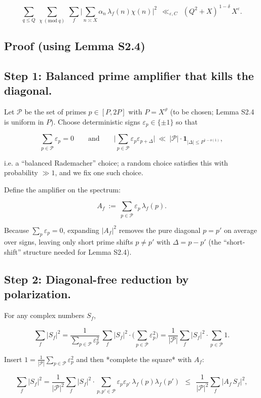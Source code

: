 \documentclass[11pt]{article}
\theoremstyle{definition}
\theoremstyle{remark}
\begin{document}
$$
\sum_{q\le Q}\ \sum_{\chi\ (\mathrm{mod}\ q)}\ \sum_{f}
\Bigg|\sum_{n\asymp X}\alpha_n\,\lambda_f(n)\chi(n)\Bigg|^2
\ \ \ll_{\varepsilon,C}\ \ (Q^2+X)^{\,1-\delta}\,X^{\varepsilon}.
$$

\subsection*{Proof (using Lemma S2.4)}

\subsection*{Step 1: Balanced prime amplifier that kills the diagonal.}
Let $\mathcal P$ be the set of primes $p\in[P,2P]$ with $P=X^\vartheta$ (to be chosen; Lemma S2.4 is uniform in $P$).
Choose deterministic signs $\varepsilon_p\in\{\pm 1\}$ so that

$$
\sum_{p\in\mathcal P}\varepsilon_p=0
\qquad\text{and}\qquad
\Big|\sum_{p\in\mathcal P}\varepsilon_p\varepsilon_{p+\Delta}\Big|\ \ll\ |\mathcal P|\cdot \mathbf{1}_{|\Delta|\le P^{1-o(1)}},
$$

i.e. a “balanced Rademacher” choice; a random choice satisfies this with probability $\gg 1$, and we fix one such choice.

Define the amplifier on the spectrum:

$$
A_f \ :=\ \sum_{p\in\mathcal P}\varepsilon_p\,\lambda_f(p).
$$

Because $\sum_p\varepsilon_p=0$, expanding $|A_f|^2$ removes the pure diagonal $p=p'$ on average over signs, leaving only short prime shifts $p\neq p'$ with $\Delta = p-p'$ (the “short-shift” structure needed for Lemma S2.4).

\subsection*{Step 2: Diagonal-free reduction by polarization.}
For any complex numbers $S_f$,

$$
\sum_f |S_f|^2
=\frac{1}{\sum_{p\in\mathcal P}\varepsilon_p^2}\,
\sum_f |S_f|^2\cdot \Big(\sum_{p\in\mathcal P}\varepsilon_p^2\Big)
=\frac{1}{|\mathcal P|}\sum_f |S_f|^2\cdot \sum_{p\in\mathcal P}1.
$$

Insert $1=\frac{1}{|\mathcal P|}\sum_{p\in\mathcal P}\varepsilon_p^2$ and then *complete the square* with $A_f$:

$$
\sum_f |S_f|^2
=\frac{1}{|\mathcal P|^2}\sum_f |S_f|^2\cdot \sum_{p,p'\in\mathcal P}\varepsilon_p\varepsilon_{p'}\,\lambda_f(p)\lambda_f(p')
\ \ \le\ \ \frac{1}{|\mathcal P|^2}\sum_f |A_f\,S_f|^2,
$$
\end{document}
